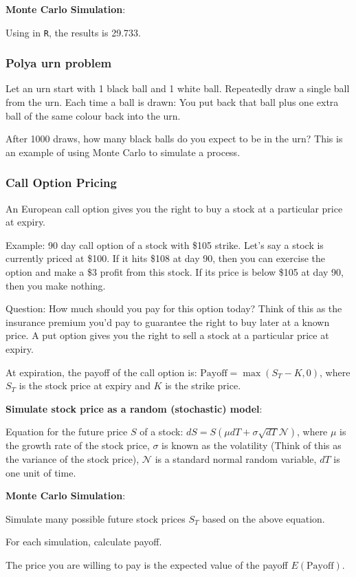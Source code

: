 \bigskip

\noindent\textbf{Monte Carlo Simulation}:

Using in \texttt{R}, the results is 29.733.

\subsubsection{Polya urn problem}

\indent

Let an urn start with 1 black ball and 1 white ball. Repeatedly draw a single ball from the urn. Each time a ball is drawn: You put back that ball plus one extra ball of the same colour back into the urn.

After 1000 draws, how many black balls do you expect to be in the urn? This is an example of using Monte Carlo to simulate a process.

\subsubsection{Call Option Pricing}

\indent

An European call option gives you the right to buy a stock at a particular price at expiry. 

Example: 90 day call option of a stock with \$105 strike. Let’s say a stock is currently priced at \$100. If it hits \$108 at day 90, then you can exercise the option and make a \$3 profit from this stock. If its price is below \$105 at day 90, then you make nothing.

Question: How much should you pay for this option today? Think of this as the insurance premium you’d pay to guarantee the right to buy later at a known price. A put option gives you the right to sell a stock at a particular price at expiry.

At expiration, the payoff of the call option is: $\text{Payoff} = \max (S_T - K,0)$, where $S_T$ is the stock price at expiry and $K$ is the strike price.

\noindent\textbf{Simulate stock price as a random (stochastic) model}:

Equation for the future price $S$ of a stock: $dS = S(\mu dT+\sigma\sqrt{dT}\mathcal{N})$, where $\mu$ is the growth rate of the stock price, $\sigma$ is known as the volatility (Think of this as the variance of the stock price), $\mathcal{N}$ is a standard normal random variable, $dT$ is one unit of time.

\noindent\textbf{Monte Carlo Simulation}:

\step Simulate many possible future stock prices $S_T$  based on the above equation.

\step For each simulation, calculate payoff.

\step The price you are willing to pay is the expected value of the payoff $E(\text{Payoff})$.

